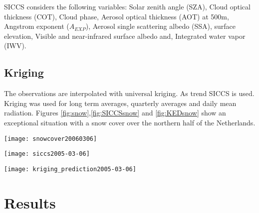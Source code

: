 \documentclass[]{article}
\begin{document}
SICCS considers the following variables: Solar zenith angle (SZA), Cloud optical thickness (COT), Cloud phase, Aerosol optical thickness (AOT) at 500m, Angstrom exponent ($A_{EXP}$), Aerosol single scattering albedo (SSA), surface elevation, Visible and near-infrared surface albedo and, Integrated water vapor (IWV).


\subsection*{Kriging}
The observations are interpolated with universal kriging. As trend SICCS is used. Kriging was used for long term averages, quarterly averages and daily mean radiation. Figures \ref{fig:snow},\ref{fig:SICCSsnow} and \ref{fig:KEDsnow} show an exceptional situation with a snow cover over the northern half of the Netherlands. 

\vspace{20pt plus 10pt minus 5pt}
\begin{minipage}[b]{\columnwidth}
	\begin{center}
		
		\begin{minipage}[b]{0.28\columnwidth}
			\centering
			\texttt{[image: snowcover20060306]}
			\label{fig:snow}
		\end{minipage}
		\hspace{0.5cm}
		\begin{minipage}[b]{0.28\columnwidth}
			\centering
			\texttt{[image: siccs2005-03-06]}
			\label{fig:SICCSsnow}
		\end{minipage}
		\hspace{0.5cm}
		\begin{minipage}[b]{0.28\columnwidth}
			\centering
			\texttt{[image: kriging\_prediction2005-03-06]}
			\label{fig:KEDsnow}
		\end{minipage}
	\end{center}
\end{minipage}




\section*{Results}
\end{document}
